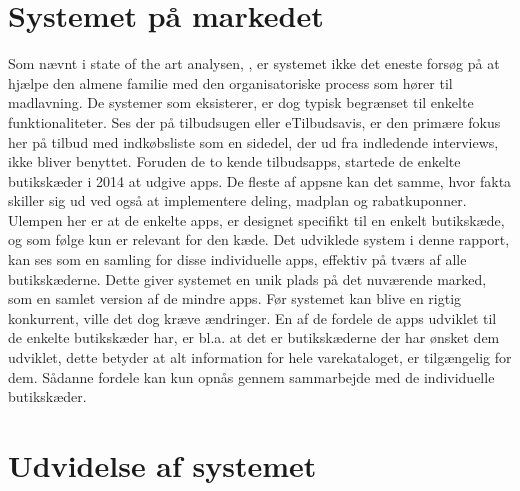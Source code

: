 \section{Systemet på markedet}
Som nævnt i state of the art analysen, , er systemet ikke det eneste forsøg på at hjælpe den almene familie med den organisatoriske process som hører til madlavning.
De systemer som eksisterer, er dog typisk begrænset til enkelte funktionaliteter.
Ses der på tilbudsugen eller eTilbudsavis, er den primære fokus her på tilbud med indkøbsliste som en sidedel, der ud fra indledende interviews, ikke bliver benyttet.
Foruden de to kende tilbudsapps, startede de enkelte butikskæder i 2014 at udgive apps.
De fleste af appsne kan det samme, hvor fakta skiller sig ud ved også at implementere deling, madplan og rabatkuponner.
Ulempen her er at de enkelte apps, er designet specifikt til en enkelt butikskæde, og som følge kun er relevant for den kæde.
Det udviklede system i denne rapport, kan ses som en samling for disse individuelle apps, effektiv på tværs af alle butikskæderne.
Dette giver systemet en unik plads på det nuværende marked, som en samlet version af de mindre apps.
Før systemet kan blive en rigtig konkurrent, ville det dog kræve ændringer.
En af de fordele de apps udviklet til de enkelte butikskæder har, er bl.a. at det er butikskæderne der har ønsket dem udviklet, dette betyder at alt information for hele varekataloget, er tilgængelig for dem.
Sådanne fordele kan kun opnås gennem sammarbejde med de individuelle butikskæder.



\section{Udvidelse af systemet}
